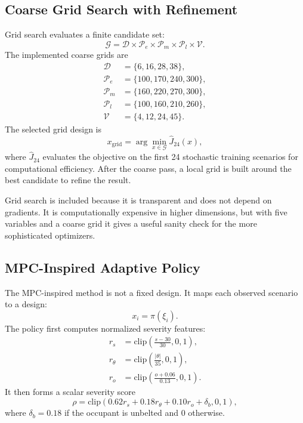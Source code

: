 \documentclass[conference]{IEEEtran}
\begin{document}
\subsection{Coarse Grid Search with Refinement}
Grid search evaluates a finite candidate set:
\begin{equation}
\mathcal{G}=\mathcal{D}\times\mathcal{P}_e\times\mathcal{P}_m\times\mathcal{P}_l\times\mathcal{V}.
\end{equation}
The implemented coarse grids are
\begin{align}
\mathcal{D}&=\{6,16,28,38\},\\
\mathcal{P}_e&=\{100,170,240,300\},\\
\mathcal{P}_m&=\{160,220,270,300\},\\
\mathcal{P}_l&=\{100,160,210,260\},\\
\mathcal{V}&=\{4,12,24,45\}.
\end{align}
The selected grid design is
\begin{equation}
x_{\mathrm{grid}}=\arg\min_{x\in\mathcal{G}}\hat{J}_{24}(x),
\end{equation}
where $\hat{J}_{24}$ evaluates the objective on the first 24 stochastic training scenarios for computational efficiency. After the coarse pass, a local grid is built around the best candidate to refine the result.

Grid search is included because it is transparent and does not depend on gradients. It is computationally expensive in higher dimensions, but with five variables and a coarse grid it gives a useful sanity check for the more sophisticated optimizers.

\subsection{MPC-Inspired Adaptive Policy}
The MPC-inspired method is not a fixed design. It maps each observed scenario to a design:
\begin{equation}
x_i=\pi(\xi_i).
\end{equation}
The policy first computes normalized severity features:
\begin{align}
r_s &= \mathrm{clip}\left(\frac{s-30}{30},0,1\right),\\
r_\theta &= \mathrm{clip}\left(\frac{|\theta|}{35},0,1\right),\\
r_o &= \mathrm{clip}\left(\frac{o+0.06}{0.13},0,1\right).
\end{align}
It then forms a scalar severity score
\begin{equation}
\rho=\mathrm{clip}(0.62r_s+0.18r_\theta+0.10r_o+\delta_b,0,1),
\end{equation}
where $\delta_b=0.18$ if the occupant is unbelted and $0$ otherwise.
\end{document}
